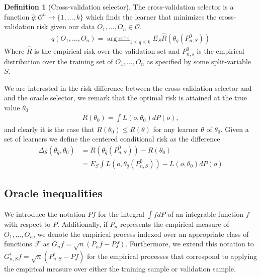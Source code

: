 \documentclass[11pt, a4paper]{article}
\DeclareMathOperator*{\argmin}{arg\,min}
\theoremstyle{definition}
\newtheorem{definition}[theorem]{Definition}
\theoremstyle{remark}
\newcommand{\cl}{q}
\begin{document}
\begin{definition}[Cross-validation selector]
    The cross-validation selector is a function $ \hat{\cl}: \mathcal{O}^{n} \to \{1,\ldots,k\} $  which finds the learner that minimizes the cross-validation risk given our data $ O_1 , \dots , O_n \in \mathcal{O} $. 
    \begin{align*}
        \hat{\cl}(O_1 , \dots , O_n) = \argmin_{1 \leq \cl \leq k} E_S \hat{R} ( \theta _\cl (P_{n,S}^0 )) 
    \end{align*}
    Where $ \hat{R}  $ is the empirical risk over the validation set and $ P_{n ,s}^{0} $ is the empirical distribution over the training set of $ O_1 , \dots , O_n  $ as specified by some split-variable $ S $. 
\end{definition}
We are interested in the risk difference between the cross-validation selector and and the oracle selector, we remark that the optimal risk is attained at the true value $ \theta_0 $ 
\begin{align*}
    R(\theta_0) = \int L(o, \theta_0)  dP(o),
\end{align*}
and clearly it is the case that $ R(\theta_0) \leq R( \theta  ) $ for any learner $ \theta $ of $ \theta_0 $.
Given a set of learners we define the centered conditional risk as the difference 
\begin{align*}
    \Delta_{S}( \theta_{ \hat{\cl} }, \theta_0 ) &= R( \theta _{ \hat{\cl} }(P_{n, S}^{0})) -R(\theta_0) \\
                                                       &= E_{S} \int L(o, \theta_{ \hat{\cl} }(P_{n, S}^{0})) - L(o, \theta_0) dP(o) 
\end{align*}

\subsection{Oracle inequalities}
We introduce the notation $Pf$ for the integral $\int f dP$ of an integrable function $f$ with respect to $P$. Additionally, if $P_n$ represents the empirical measure of $O_1, \dots, O_n$, we denote the empirical process indexed over an appropriate class of functions $\mathcal{F}$ as $G_n f = \sqrt{n}(P_n f - P f)$. Furthermore, we extend this notation to $G_{n, S}^{i} f = \sqrt{n}(P_{n, S}^{i} - Pf)$ for the empirical processes that correspond to applying the empirical measure over either the training sample or validation sample.
\end{document}
